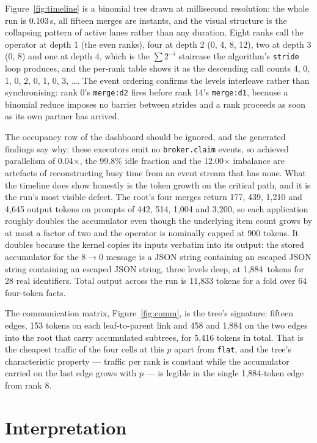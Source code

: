 \documentclass[11pt]{article}
\begin{document}
Figure~\ref{fig:timeline} is a binomial tree drawn at millisecond resolution: the whole run
is 0.103\,s, all fifteen merges are instants, and the visual structure is the collapsing
pattern of active lanes rather than any duration. Eight ranks call the operator at depth 1
(the even ranks), four at depth 2 (0, 4, 8, 12), two at depth 3 (0, 8) and one at depth 4,
which is the $\sum 2^{-i}$ staircase the algorithm's \texttt{stride} loop produces, and the
per-rank table shows it as the descending call counts 4, 0, 1, 0, 2, 0, 1, 0, 3, \dots. The
event ordering confirms the levels interleave rather than synchronising: rank 0's
\texttt{merge:d2} fires before rank 14's \texttt{merge:d1}, because a binomial reduce
imposes no barrier between strides and a rank proceeds as soon as its own partner has
arrived.

The occupancy row of the dashboard should be ignored, and the generated findings say why:
these executors emit no \texttt{broker.claim} events, so achieved parallelism of
0.04$\times$, the 99.8\% idle fraction and the 12.00$\times$ imbalance are artefacts of
reconstructing busy time from an event stream that has none. What the timeline does show
honestly is the token growth on the critical path, and it is the run's most visible defect.
The root's four merges return 177, 439, 1{,}210 and 4{,}645 output tokens on prompts of
442, 514, 1{,}004 and 3{,}200, so each application roughly doubles the accumulator even
though the underlying item count grows by at most a factor of two and the operator is
nominally capped at 900 tokens. It doubles because the kernel copies its inputs verbatim
into its output: the stored accumulator for the $8\to0$ message is a JSON string containing
an escaped JSON string containing an escaped JSON string, three levels deep, at
1{,}884~tokens for 28 real identifiers. Total output across the run is 11{,}833 tokens for
a fold over 64 four-token facts.

The communication matrix, Figure~\ref{fig:comm}, is the tree's signature: fifteen edges,
153 tokens on each leaf-to-parent link and 458 and 1{,}884 on the two edges into the root
that carry accumulated subtrees, for 5{,}416 tokens in total. That is the cheapest traffic
of the four cells at this $p$ apart from \texttt{flat}, and the tree's characteristic
property --- traffic per rank is constant while the accumulator carried on the last edge
grows with $p$ --- is legible in the single 1{,}884-token edge from rank 8.

\section{Interpretation}
\end{document}
